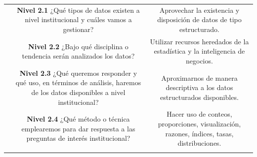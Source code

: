 \documentclass[
]{book}
\begin{document}
\begin{longtable}[]{@{}lcc@{}}
\begin{minipage}[t]{0.04\columnwidth}
\end{minipage} & \begin{minipage}[t]{0.18\columnwidth}\centering
\textbf{Nivel 2.1} ¿Qué tipos de datos existen a nivel institucional y cuáles vamos a gestionar?\strut
\end{minipage} & \begin{minipage}[t]{0.69\columnwidth}\centering
Aprovechar la existencia y disposición de datos de tipo estructurado.\strut
\end{minipage}\tabularnewline
\begin{minipage}[t]{0.04\columnwidth}\raggedright
\strut
\end{minipage} & \begin{minipage}[t]{0.18\columnwidth}\centering
\textbf{Nivel 2.2} ¿Bajo qué disciplina o tendencia serán analizados los datos?\strut
\end{minipage} & \begin{minipage}[t]{0.69\columnwidth}\centering
Utilizar recursos heredados de la estadística y la inteligencia de negocios.\strut
\end{minipage}\tabularnewline
\begin{minipage}[t]{0.04\columnwidth}\raggedright
\strut
\end{minipage} & \begin{minipage}[t]{0.18\columnwidth}\centering
\textbf{Nivel 2.3} ¿Qué queremos responder y qué uso, en términos de análisis, haremos de los datos disponibles a nivel institucional?\strut
\end{minipage} & \begin{minipage}[t]{0.69\columnwidth}\centering
Aproximarnos de manera descriptiva a los datos estructurados disponibles.\strut
\end{minipage}\tabularnewline
\begin{minipage}[t]{0.04\columnwidth}\raggedright
\strut
\end{minipage} & \begin{minipage}[t]{0.18\columnwidth}\centering
\textbf{Nivel 2.4} ¿Qué método o técnica emplearemos para dar respuesta a las preguntas de interés institucional?\strut
\end{minipage} & \begin{minipage}[t]{0.69\columnwidth}\centering
Hacer uso de conteos, proporciones, visualización, razones, índices, tasas, distribuciones.\strut
\end{minipage}\tabularnewline
\begin{minipage}[t]{0.04\columnwidth}\raggedright

\end{minipage}
\end{longtable}
\end{document}
